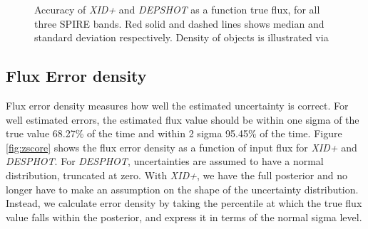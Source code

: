 \documentclass[useAMS,usenatbib]{mnras}
\begin{document}
\begin{figure}
\caption{Accuracy of \emph{XID+} and \emph{DEPSHOT} as a function true flux, for all three SPIRE bands. Red solid and dashed lines shows median and standard deviation respectively. Density of objects is illustrated via }\label{fig:accuracy}
\end{figure}

\subsection{Flux Error density}
Flux error density measures how well the estimated uncertainty is correct. For well estimated errors, the estimated flux value should be within one sigma of the true value 68.27\% of the time and within 2 sigma 95.45\% of the time. Figure \ref{fig:zscore} shows the flux error density as a function of input flux for \emph{XID+} and \emph{DESPHOT}. For \emph{DESPHOT}, uncertainties are assumed to have a normal distribution, truncated at zero. With \emph{XID+}, we have the full posterior and no longer have to make an assumption on the shape of the uncertainty distribution. Instead, we calculate error density by taking the percentile at which the true flux value falls within the posterior, and express it in terms of the normal sigma level.
\end{document}
